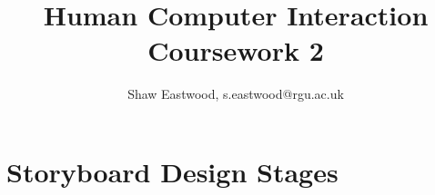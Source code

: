 \documentclass{article}
\title{Human Computer Interaction \\ Coursework 2}
\author{Shaw Eastwood, s.eastwood@rgu.ac.uk}
\begin{document}
	\maketitle

	\section{Storyboard Design Stages}

	
	
\end{document}
